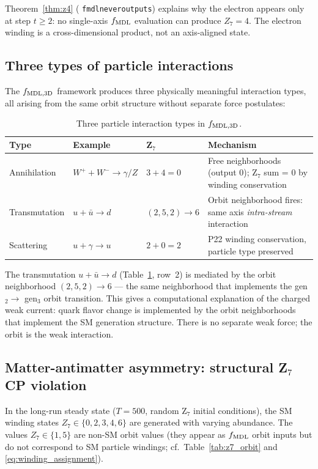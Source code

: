 \documentclass[11pt]{article}
\theoremstyle{remark}
\newcommand{\lean}[1]{%
  \penalty-100
  \begingroup\def\_{\textunderscore\allowbreak}\texttt{#1}\endgroup}
\begin{document}
Theorem~\ref{thm:z4} (\lean{fmdl\_never\_outputs\_4}) explains why the electron
appears only at step $t \geq 2$: no single-axis $f_{\rm MDL}$ evaluation can produce
$Z_7 = 4$. The electron winding is a cross-dimensional product, not an axis-aligned state.

\subsection{Three types of particle interactions}

The $f_{\rm MDL, 3D}$ framework produces three physically meaningful interaction types,
all arising from the same orbit structure without separate force postulates:

\begin{table}[H]
\centering
\caption{Three particle interaction types in $f_{\rm MDL, 3D}$.}
\label{tab:interactions}
\small
\renewcommand{\arraystretch}{1.2}
\begin{tabular}{@{}lllp{4.5cm}@{}}
\toprule
\textbf{Type} & \textbf{Example} & \textbf{Z$_7$} & \textbf{Mechanism}\\
\midrule
Annihilation & $W^+ + W^- \to \gamma/Z$ & $3 + 4 = 0$ &
  Free neighborhoods (output 0); Z$_7$ sum = 0 by winding conservation\\
Transmutation & $u + \bar{u} \to d$ & $(2,5,2) \to 6$ &
  Orbit neighborhood fires: same axis \emph{intra-stream} interaction\\
Scattering & $u + \gamma \to u$ & $2 + 0 = 2$ &
  P22 winding conservation, particle type preserved\\
\bottomrule
\end{tabular}
\end{table}

The transmutation $u + \bar{u} \to d$ (Table~\ref{tab:interactions}, row~2) is mediated
by the orbit neighborhood $(2,5,2) \to 6$ --- the same neighborhood that implements the
gen$_2 \to$ gen$_3$ orbit transition. This gives a computational explanation of the
charged weak current: quark flavor change is implemented by the orbit neighborhoods
that implement the SM generation structure. There is no separate weak force;
the orbit is the weak interaction.

\subsection{Matter-antimatter asymmetry: structural Z$_7$ CP violation}

In the long-run steady state ($T = 500$, random Z$_7$ initial conditions),
the SM winding states $Z_7 \in \{0,2,3,4,6\}$ are generated with varying abundance.
The values $Z_7 \in \{1,5\}$ are non-SM orbit values (they appear as $f_{\rm MDL}$
orbit inputs but do not correspond to SM particle windings; cf.\ Table~\ref{tab:z7_orbit}
and \eqref{eq:winding_assignment}).
\end{document}
